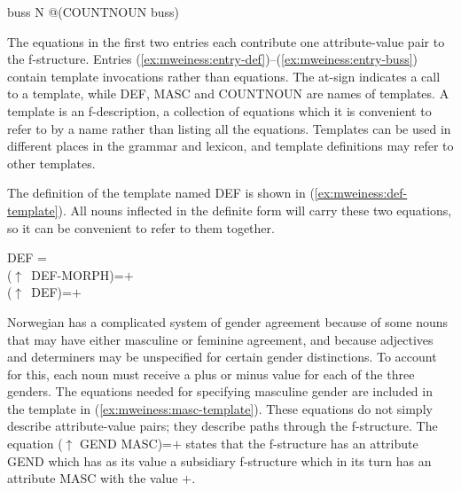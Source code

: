 \documentclass[output=paper]{langsci/langscibook}
\begin{document}
\ea\label{ex:mweiness:entry-buss}
{\small 
buss  \hspace{1.5em} N \hspace{1.8em} @(COUNTNOUN buss)
}
\z


The equations in the first two entries each contribute one attribute-value pair to the f-structure.
Entries (\ref{ex:mweiness:entry-def})--(\ref{ex:mweiness:entry-buss}) contain template invocations rather than equations.
The at-sign indicates a call to a template, while DEF, MASC and COUNTNOUN are names of templates.
A template is an f-description, a collection of equations which it is convenient to refer to by a name rather than listing all the equations.
Templates can be used in different places in the grammar and lexicon, and template definitions may refer to other templates.

The definition of the template named DEF is shown in (\ref{ex:mweiness:def-template}).
All nouns inflected in the definite form will carry these two equations, so it can be convenient to refer to them together.

\ea\label{ex:mweiness:def-template}
{\small 
DEF = \\
\hspace{2em}  ($\uparrow$~DEF-MORPH)=$+$ \\
\hspace{2em}  ($\uparrow$~DEF)=$+$ \\
}
\z



Norwegian has a complicated system of gender agreement because of some nouns that may have either masculine or feminine agreement, and because adjectives and determiners may be unspecified for certain gender distinctions.
To account for this, each noun must receive a plus or minus value for each of the three genders.
The equations needed for specifying masculine gender are included in the template in (\ref{ex:mweiness:masc-template}).
These equations do not simply describe attribute-value pairs; they describe paths through the f-structure.
The equation ($\uparrow$ GEND MASC)=$+$ states that the f-structure has an attribute GEND which has as its value a subsidiary f-structure which in its turn has an attribute MASC with the value $+$.
\end{document}
